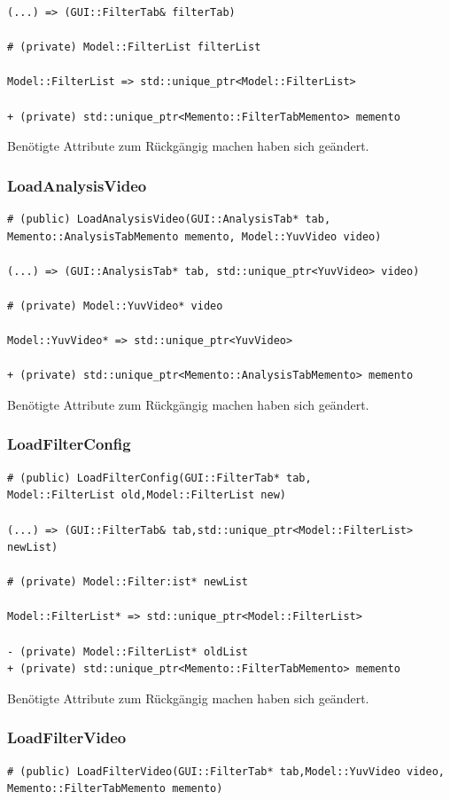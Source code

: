 \documentclass{scrartcl}
\begin{document}
{\begin{verbatim}
(...) => (GUI::FilterTab& filterTab)

# (private) Model::FilterList filterList

Model::FilterList => std::unique_ptr<Model::FilterList>

+ (private) std::unique_ptr<Memento::FilterTabMemento> memento
\end{verbatim}
Benötigte Attribute zum Rückgängig machen haben sich geändert.
\newpage
\subsubsection{LoadAnalysisVideo}
\begin{verbatim}
# (public) LoadAnalysisVideo(GUI::AnalysisTab* tab, 
Memento::AnalysisTabMemento memento, Model::YuvVideo video)

(...) => (GUI::AnalysisTab* tab, std::unique_ptr<YuvVideo> video)

# (private) Model::YuvVideo* video

Model::YuvVideo* => std::unique_ptr<YuvVideo>

+ (private) std::unique_ptr<Memento::AnalysisTabMemento> memento
\end{verbatim}
Benötigte Attribute zum Rückgängig machen haben sich geändert.
\bigskip
\subsubsection{LoadFilterConfig}
\begin{verbatim}
# (public) LoadFilterConfig(GUI::FilterTab* tab,
Model::FilterList old,Model::FilterList new)

(...) => (GUI::FilterTab& tab,std::unique_ptr<Model::FilterList> newList)

# (private) Model::Filter:ist* newList

Model::FilterList* => std::unique_ptr<Model::FilterList>

- (private) Model::FilterList* oldList
+ (private) std::unique_ptr<Memento::FilterTabMemento> memento
\end{verbatim}
Benötigte Attribute zum Rückgängig machen haben sich geändert.
\bigskip
\subsubsection{LoadFilterVideo}
\begin{verbatim}
# (public) LoadFilterVideo(GUI::FilterTab* tab,Model::YuvVideo video,
Memento::FilterTabMemento memento)


\end{verbatim}}
\end{document}
